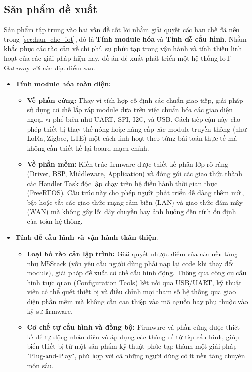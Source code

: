     \subsection{Sản phẩm đề xuất}
        Sản phẩm tập trung vào hai vấn đề cốt lõi nhằm giải quyết các hạn chế đã nêu trong \autoref{sec:han_che_iot}, đó là \textbf{Tính module hóa} và \textbf{Tính dễ cấu hình}.
        Nhằm khắc phục các rào cản về chi phí, sự phức tạp trong vận hành và tính thiếu linh hoạt của các giải pháp hiện nay, đồ án đề xuất phát triển một hệ thống IoT Gateway với các đặc điểm sau:
        \begin{itemize}
            \item \textbf{Tính module hóa toàn diện:}
            \begin{itemize}
                \item \textbf{Về phần cứng:} Thay vì tích hợp cố định các chuẩn giao tiếp, giải pháp sử dụng cơ chế lắp ráp module dựa trên việc chuẩn hóa các giao diện ngoại vi phổ biến như UART, SPI, I2C, và USB. Cách tiếp cận này cho phép thiết bị thay thế nóng hoặc nâng cấp các module truyền thông (như LoRa, Zigbee, LTE) một cách linh hoạt theo từng bài toán thực tế mà không cần thiết kế lại board mạch chính.
                \item \textbf{Về phần mềm:} Kiến trúc firmware được thiết kế phân lớp rõ ràng (Driver, BSP, Middleware, Application) và đóng gói các giao thức thành các Handler Task độc lập chạy trên hệ điều hành thời gian thực (FreeRTOS). Cấu trúc này cho phép người phát triển dễ dàng thêm mới, bật hoặc tắt các giao thức mạng cảm biến (LAN) và giao thức đám mây (WAN) mà không gây lỗi dây chuyền hay ảnh hưởng đến tính ổn định của toàn hệ thống.
            \end{itemize}
            \item \textbf{Tính dễ cấu hình và vận hành thân thiện:}
            \begin{itemize}
                \item \textbf{Loại bỏ rào cản lập trình:} Giải quyết nhược điểm của các nền tảng như M5Stack (vốn yêu cầu người dùng phải nạp lại code khi thay đổi module), giải pháp đề xuất cơ chế cấu hình động. Thông qua công cụ cấu hình trực quan (Configuration Tools) kết nối qua USB/UART, kỹ thuật viên có thể quét thiết bị và điều chỉnh mọi tham số hệ thống qua giao diện phần mềm mà không cần can thiệp vào mã nguồn hay phụ thuộc vào kỹ sư firmware.
                \item \textbf{Cơ chế tự cấu hình và đồng bộ:} Firmware và phần cứng được thiết kế để tự động nhận diện và áp dụng các thông số từ tệp cấu hình, giúp biến thiết bị từ một sản phẩm kỹ thuật phức tạp thành một giải pháp "Plug-and-Play", phù hợp với cả những người dùng có ít nền tảng chuyên môn sâu.

\end{itemize}
\end{itemize}
